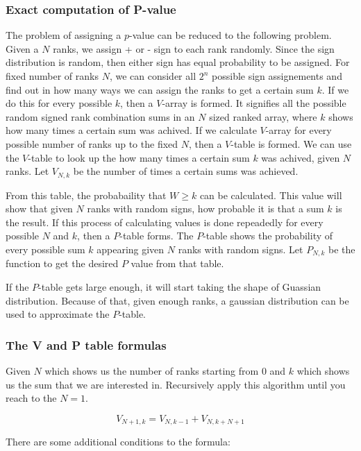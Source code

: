 \documentclass[12pt]{article}
\begin{document}
\subsubsection{Exact computation of P-value}
The problem of assigning a $p$-value can be reduced to the following problem. Given a $N$ ranks, we assign + or - sign to each rank randomly. Since the sign distribution is random, then either sign has equal probability to be assigned. For fixed number of ranks $N$, we can consider all $2^n$ possible sign assignements and find out in how many ways we can assign the ranks to get a certain sum $k$. If we do this for every possible $k$, then a $V$-array is formed. It signifies all the possible random signed rank combination sums in an $N$ sized ranked array, where $k$ shows how many times a certain sum was achived. If we calculate $V$-array for every possible number of ranks up to the fixed $N$, then a $V$-table is formed. We can use the $V$-table to look up the how many times a certain sum $k$ was achived, given $N$ ranks. Let $V_{N, k}$ be the number of times a certain sums was achieved.

From this table, the probabaility that $W\geq k$ can be calculated. This value will show that given $N$ ranks with random signs, how probable it is that a sum $k$ is the result. If this process of calculating values is done repeadedly for every possible $N$ and $k$, then a $P$-table forms. The $P$-table shows the probability of every possible sum $k$ appearing given $N$ ranks with random signs. Let $P_{N, k}$ be the function to get the desired $P$ value from that table.

If the $P$-table gets large enough, it will start taking the shape of Guassian distribution. Because of that, given enough ranks, a gaussian distribution can be used to approximate the $P$-table.

\subsubsection{The V and P table formulas}

Given $N$ which shows us the number of ranks starting from $0$ and $k$ which shows us the sum that we are interested in. Recursively apply this algorithm until you reach to the $N = 1$.

\begin{equation}
  V_{N+1, k} = V_{N, k-1} + V_{N, k+N+1}
\end{equation}

There are some additional conditions to the formula:
\end{document}
